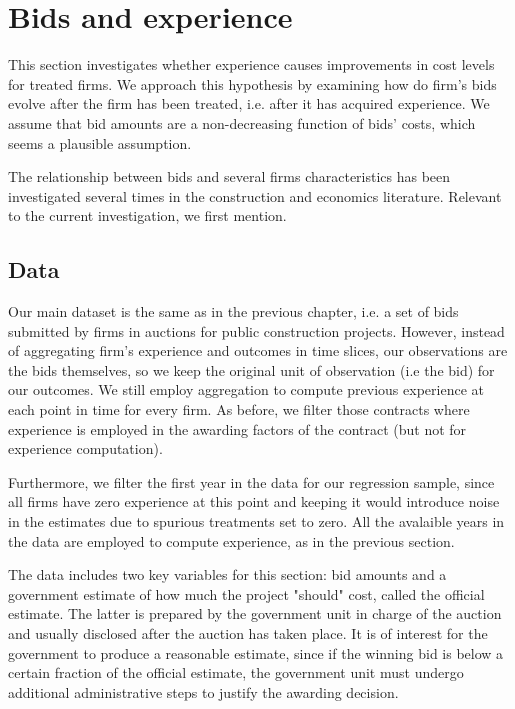 \section{Bids and experience}
\label{section:bidsexp}
This section investigates whether experience causes improvements in cost levels for treated firms. We approach this hypothesis by examining how do firm's bids evolve after the firm has been treated, i.e. after it has acquired experience. We assume that bid amounts are a non-decreasing function of bids' costs, which seems a plausible assumption.

The relationship between bids and several firms characteristics has been investigated several times in the construction and economics literature. Relevant to the current investigation, we first mention.


\subsection{Data}
Our main dataset is the same as in the previous chapter, i.e. a set of bids submitted by firms in auctions for public construction projects. However, instead of aggregating firm's experience and outcomes in time slices, our observations are the bids themselves, so we keep the original unit of observation (i.e the bid) for our outcomes. We still employ aggregation to compute previous experience at each point in time for every firm. As before, we filter those contracts where experience is employed in the awarding factors of the contract (but not for experience computation).

Furthermore, we filter the first year in the data for our regression sample, since all firms have zero experience at this point and keeping it would introduce noise in the estimates due to spurious treatments set to zero. All the avalaible years in the data are employed to compute experience, as in the previous section.

The data includes two key variables for this section: bid amounts and a government estimate of how much the project "should" cost, called the official estimate. The latter is prepared by the government unit in charge of the auction and usually disclosed after the auction has taken place. It is of interest for the government to produce a reasonable estimate, since if the winning bid is below a certain fraction of the official estimate, the government unit must undergo additional administrative steps to justify the awarding decision.

